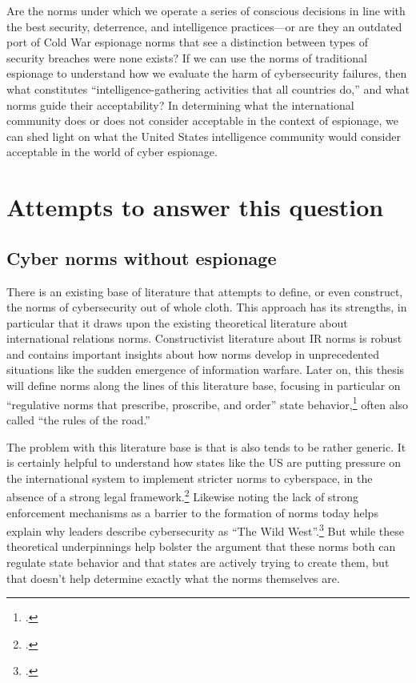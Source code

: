 \documentclass[12pt]{article}
\begin{document}
Are the norms under which we operate a series of conscious decisions in line with the best security, deterrence, and intelligence practices---or are they an outdated port of Cold War espionage norms that see a distinction between types of security breaches were none exists? If we can use the norms of traditional espionage to understand how we evaluate the harm of cybersecurity failures, then what constitutes ``intelligence-gathering activities that all countries do,'' and what norms guide their acceptability? In determining what the international community does or does not consider acceptable in the context of espionage, we can shed light on what the United States intelligence community would consider acceptable in the world of cyber espionage. 





\section{Attempts to answer this question}
\subsection{Cyber norms without espionage}
There is an existing base of literature that attempts to define, or even construct, the norms of cybersecurity out of whole cloth. This approach has its strengths, in particular that it draws upon the existing theoretical literature about international relations norms. Constructivist literature about IR norms is robust and contains important insights about how norms develop in unprecedented situations like the sudden emergence of information warfare. Later on, this thesis will define norms along the lines of this literature base, focusing in particular on ``regulative norms that prescribe, proscribe, and order'' state behavior,\footcite{bjorkdahl_norms_2002} often also called ``the rules of the road.'' 

The problem with this literature base is that is also tends to be rather generic. It is certainly helpful to understand how states like the US are putting pressure on the international system to implement stricter norms to cyberspace, in the absence of a strong legal framework.\footcite[~p.7]{finnemore_constructing_2016} Likewise noting the lack of strong enforcement mechanisms as a barrier to the formation of norms today helps explain why leaders describe cybersecurity as ``The Wild West''.\footcite{iasiello_what_2016} But while these theoretical underpinnings help bolster the argument that these norms both can regulate state behavior and that states are actively trying to create them, but that doesn't help determine exactly what the norms themselves are.
\end{document}
